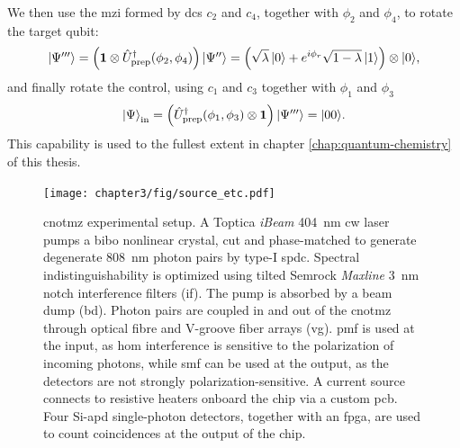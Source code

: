 We then use the \gls{mzi} formed by \glspl{dc} $c_2$ and $c_4$, together with $\phi_2$ and $\phi_4$, to rotate the target qubit:
\begin{equation}
   \mbox{$ | \Psi''' \rangle $} = 
   \left(
   \mathbf{1}
   \otimes
   \hat{U}_\mathrm{prep}^\dagger(\phi_2, \phi_4) 
   \right)\mbox{$ | \Psi'' \rangle $}  
    = \left( \sqrt{\lambda} \, \mbox{$ | 0 \rangle $} 
    + e^{i \phi_r}\sqrt{1-\lambda} \, \mbox{$ | 1 \rangle $} \right) \otimes \mbox{$ | 0 \rangle $},
\end{equation}
and finally rotate the control, using $c_1$ and $c_3$ together with $\phi_1$ and $\phi_3$
\begin{equation}
    \mbox{$ | \Psi \rangle $}_{\mathrm{in}} = 
   \left( 
   \hat{U}_\mathrm{prep}^\dagger(\phi_1, \phi_3) 
   \otimes 
   \mathbf{1} 
   \right) \mbox{$ | \Psi''' \rangle $}  
   = \mbox{$ | 00 \rangle $}.
\end{equation}
This capability is used to the fullest extent in chapter \ref{chap:quantum-chemistry} of this thesis.

\begin{figure}[t!]
\centering
\texttt{[image: chapter3/fig/source\_etc.pdf]}
\caption[Experimental setup]
{ \gls{cnotmz} experimental setup.  A Toptica \emph{iBeam} \SI{404}{\nano \metre} \gls{cw} laser pumps a \gls{bibo} nonlinear crystal, cut and phase-matched to generate degenerate \SI{808}{\nano \metre} photon pairs by type-I \gls{spdc}. Spectral indistinguishability is optimized using tilted Semrock \emph{Maxline} \SI{3}{\nano \metre} notch interference filters (\acrshort{if}). The pump is absorbed by a beam dump (\acrshort{bd}). Photon pairs are coupled in and out of the \gls{cnotmz} through optical fibre and V-groove fiber arrays (\acrshort{vg}). \gls{pmf} is used at the input, as \gls{hom} interference is sensitive to the polarization of incoming photons, while \gls{smf} can be used at the output, as the detectors are not strongly polarization-sensitive. A current source connects to resistive heaters onboard the chip via a custom \gls{pcb}. Four Si-\gls{apd} single-photon detectors, together with an \gls{fpga}, are used to count coincidences at the output of the chip.
}
\label{fig:cnotmz-experimental-setup}
\end{figure}

